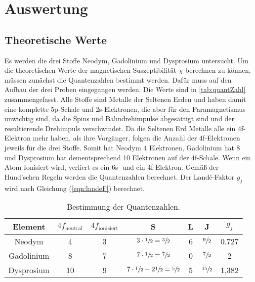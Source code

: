\section{Auswertung}
\label{sec:Auswertung}
\subsection{Theoretische Werte}
\label{subsec:theoW}
Es werden die drei Stoffe Neodym, Gadolinium und Dysprosium untersucht. Um die theoretischen Werte der magnetischen Suszeptibilität $\chi$ berechnen zu können, müssen zunächst die Quantenzahlen bestimmt werden.
Dafür muss auf den Aufbau der drei Proben eingegangen werden. Die Werte sind in \autoref{tab:quantZahl} zusammengefasst.
Alle Stoffe sind Metalle der Seltenen Erden und haben damit eine komplette 5p-Schale und 2s-Elektronen, die aber für den Paramagnetismus unwichtig sind, da die Spins und Bahndrehimpulse abgesättigt sind
und der resultierende Drehimpuls verschwindet. Da die Seltenen Erd Metalle alle ein 4f-Elektron mehr haben, als ihre Vorgänger, folgen die Anzahl der 4f-Elektronen jeweils für die drei Stoffe.
Somit hat Neodym 4 Elektronen, Gadolinium hat 8  und Dysprosium hat dementsprechend 10 Elektronen auf der 4f-Schale.
Wenn ein Atom Ionisiert wird, verliert es ein 6s- und ein 4f-Elektron.
Gemäß der Hund'schen Regeln werden die Quantenzahlen berechnet.
Der Landé-Faktor $g_j$ wird nach Gleichung (\ref{eqn:landeF}) berechnet.

\begin{table}[H]
  \centering
  \caption{Bestimmung der Quantenzahlen.}
  \label{tab:quantZahl}
  \begin{tabular}{c| c c c c c c}
    \toprule
    Element & $4f_{\text{neutral}}$ & $4f_{\text{ionisiert}}$ & S & L & J & $g_j$\\
    \midrule
    Neodym & 4 & 3 & $3\cdot\sfrac{1}{2}=\sfrac{3}{2}$ & 6 & $\sfrac{9}{2}$ & 0.727 \\
    Gadolinium & 8 & 7 & $7\cdot\sfrac{1}{2}=\sfrac{7}{2}$ & 0 & $\sfrac{7}{2}$ & 2 \\
    Dysprosium & 10 & 9 & $7\cdot\sfrac{1}{2}-2\sfrac{1}{2}=\sfrac{5}{2}$ & 5 & $\sfrac{15}{2}$ & 1,382 \\
    \bottomrule
  \end{tabular}
\end{table}

